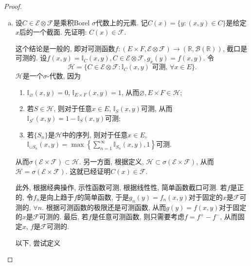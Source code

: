 \documentclass[UTF8, a4paper]{article}
\begin{document}
\begin{proof}
\begin{enumerate}[a)]
    \item 
设\(C \in \mathcal{E} \otimes \mathcal{F}\)是乘积Borel \(\sigma\)代数上的元素.
记\(C(x) = \{y: (x,y) \in C\}\)是给定\(x\)后的一个截面. 
先证明: \(C(x) \in \mathcal{F}\).


这个结论是一般的, 即对可测函数\(f: (E \times F, \mathcal{E} \otimes \mathcal{F}) \to (\mathbb{R}, \mathcal{B}(\mathbb{R}))\), 截口是可测的.
设\(f(x, y) = \mathbb{I}_C(x, y), C \in \mathcal{E} \otimes \mathcal{F}, g_x(y) = f(x,y)\). 
令
$$
\mathcal{H} = \{C \in \mathcal{E} \otimes \mathcal{F}: \mathbb{I}_C(x, y) \text{ 可测, } \forall x\in E\}.
$$
\(\mathcal{H}\)是一个\(\sigma\)-代数, 因为
\begin{enumerate}
    \item \(\mathbb{I}_{\varnothing}(x, y) = 0\), \(\mathbb{I}_{E\times F}(x, y) = 1\), 从而\(\varnothing, E\times F \in \mathcal{H}\);
    \item 若\(S\in \mathcal{H}\), 则对于任意\(x\in E\), \(\mathbb{I}_S(x,y)\)可测, 从而\(\mathbb{I}_{S^c}(x,y) = 1 - \mathbb{I}_{S}(x, y)\)可测;
    \item 若\(\{S_n\}\)是\(\mathcal{H}\)中的序列, 则对于任意\(x\in E\), \(\mathbb{I}_{\cup S_n}(x, y) = \max\left\{\sum_{n=1}^{\infty}\mathbb{I}_{S_n}(x, y), 1\right\}\)可测.
\end{enumerate}
从而\(\sigma(\mathcal{E} \times \mathcal{F}) \subset \mathcal{H}\).
另一方面, 根据定义, \(\mathcal{H} \subset \sigma(\mathcal{E} \times \mathcal{F})\), 从而\(\mathcal{H} = \sigma(\mathcal{E} \times \mathcal{F})\).
这就已经证明\(C(x) \in \mathcal{F}\).

此外, 根据经典操作, 示性函数可测, 根据线性性, 简单函数截口可测. 
若\(f\)是正的, 令\(f_n\)是向上趋于\(f\)的简单函数, 于是\(g_n(y) = f_n(x,y)\)对于固定的\(x\)是\(\mathcal{F}\)可测的, \(\forall n\).
根据可测函数的极限还是可测函数, 从而\(g(y) = f(x,y)\)对于固定的\(x\)是\(\mathcal{F}\)可测的.
最后, 若\(f\)是任意可测函数, 则只需要考虑\(f = f^+ - f^-\), 从而固定\(x\), \(f\)是\(\mathcal{F}\)可测的.

以下, 尝试定义



\end{enumerate}
\end{proof}
\end{document}
